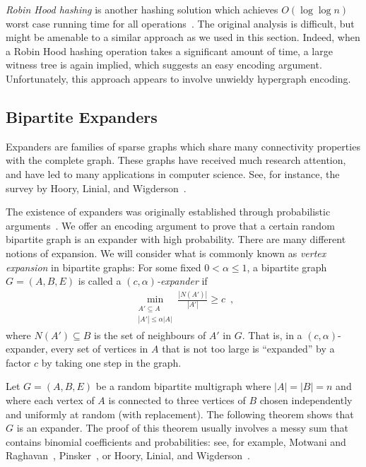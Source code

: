 \documentclass{patmorin}
\begin{document}
\begin{rem}
  \emph{Robin Hood hashing} is another hashing solution which achieves
  $O(\log \log n)$ worst case running time for all
  operations~\cite{devroye:robin}. The original analysis is difficult,
  but might be amenable to a similar approach as we used in
  this section. Indeed, when a Robin Hood hashing operation takes a
  significant amount of time, a large witness tree is again implied,
  which suggests an easy encoding argument. Unfortunately, this
  approach appears to involve unwieldy hypergraph encoding.
\end{rem}


\subsection{Bipartite Expanders}

Expanders are families of sparse graphs which share many connectivity
properties with the complete graph. These
graphs have received much research attention, and have led to many
applications in computer science. See, for instance, the survey by
Hoory, Linial, and Wigderson~\cite{hoory.linial.ea:expander}.

The existence of expanders was originally
established through probabilistic arguments~\cite{pinsker:expanders}.
We offer an encoding argument to prove that a certain random bipartite
graph is an expander with high probability. There are many different
notions of expansion. We will consider what is commonly known as
\emph{vertex expansion} in bipartite graphs: For some fixed
$0 < \alpha \leq 1$, a bipartite graph $G = (A, B, E)$ is called a
\emph{$(c, \alpha)$-expander} if
\begin{align*}
  \min_{\substack{{A' \subseteq A}\\{|A'| \leq \alpha |A|}}} \frac{|N(A')|}{|A'|} \geq c \enspace ,
\end{align*}
where $N(A') \subseteq B$ is the set of neighbours of $A'$ in $G$.
That is, in a $(c, \alpha)$-expander, every set  of vertices in
$A$ that is not too large is ``expanded'' by a factor $c$ by taking
one step in the graph.

Let $G = (A, B, E)$ be a random bipartite multigraph where
$|A| = |B| = n$ and where each vertex of $A$ is connected to three
vertices of $B$ chosen independently and uniformly at random (with
replacement). The following theorem shows that $G$ is an expander.
The proof of this theorem usually involves a messy sum that contains
binomial coefficients and probabilities: see, for example, Motwani and
Raghavan~\cite[Theorem~5.3]{motwani.raghavan:randomized},
Pinsker~\cite[Lemma~1]{pinsker:expanders}, or Hoory, Linial, and
Wigderson~\cite[Lemma~1.9]{hoory.linial.ea:expander}.
\end{document}
